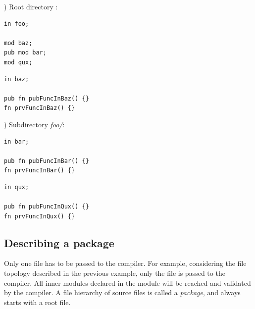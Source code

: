 ) Root directory :

\vspace{-5pt}%
\begin{minipage}[t][][t]{0.47\linewidth}
\begin{lstlisting}[caption=\textit{./foo.yr}, style=coloredverbatim]
in foo;

mod baz;
pub mod bar;
mod qux;

\end{lstlisting}
\end{minipage}\hspace{5pt}%
\begin{minipage}[t][][t]{0.47\linewidth}
\begin{lstlisting}[caption=\textit{./baz.yr}, style=coloredverbatim]
in baz;

pub fn pubFuncInBaz() {}
fn prvFuncInBaz() {}
\end{lstlisting}
\end{minipage}


) Subdirectory \textit{foo/}:

\vspace{-5pt}%
\begin{minipage}[t][][t]{0.47\linewidth}
\begin{lstlisting}[caption=\textit{./foo/bar.yr}, style=coloredverbatim]
in bar;

pub fn pubFuncInBar() {}
fn prvFuncInBar() {}
\end{lstlisting}
\end{minipage}\hspace{5pt}%
\begin{minipage}[t][][t]{0.47\linewidth}
\begin{lstlisting}[caption=\textit{./foo/qux.yr}, style=coloredverbatim]
in qux;

pub fn pubFuncInQux() {}
fn prvFuncInQux() {}
\end{lstlisting}
\end{minipage}

\subsection{Describing a package}

Only one file has to be passed to the compiler. For example, considering the
file topology described in the previous example, only the  file
is passed to the compiler. All inner modules declared in the  module
will be reached and validated by the compiler. A file hierarchy of source files
is called a \emph{package}, and always starts with a root file.

